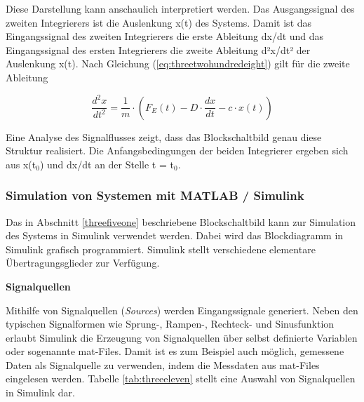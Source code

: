 \noindent Diese Darstellung kann anschaulich interpretiert werden. Das Ausgangssignal des zweiten Integrierers ist die Auslenkung x(t) des Systems. Damit ist das Eingangssignal des zweiten Integrierers die erste Ableitung dx/dt und das Eingangssignal des ersten Integrierers die zweite Ableitung d²x/dt² der Auslenkung x(t). Nach Gleichung (\ref{eq:threetwohundredeight}) gilt für die zweite Ableitung

\begin{equation}\label{eq:threetwohundrednine}
\frac{d^{2} x}{dt^{2}} = \frac{1}{m} \cdot (F_{E}(t) - D\cdot \frac{dx}{dt} - c\cdot x\left(t\right))
\end{equation}

\noindent Eine Analyse des Signalflusses zeigt, dass das Blockschaltbild genau diese Struktur realisiert. Die
Anfangsbedingungen der beiden Integrierer ergeben sich aus x(t$_{0}$) und dx/dt an der Stelle t = t$_{0}$.

\subsubsection{Simulation von Systemen mit MATLAB / Simulink}

\noindent Das in Abschnitt \ref{threefiveone} beschriebene Blockschaltbild kann zur Simulation des Systems in Simulink verwendet werden. Dabei wird das Blockdiagramm in Simulink grafisch programmiert. Simulink stellt verschiedene elementare Übertragungsglieder zur Verfügung.\medskip

{\selectfont
\noindent\textbf{Signalquellen}}

\noindent Mithilfe von Signalquellen (\textit{Sources}) werden Eingangssignale generiert. Neben den typischen Signalformen wie Sprung-, Rampen-, Rechteck- und Sinusfunktion erlaubt Simulink die Erzeugung von Signalquellen über selbst definierte Variablen oder sogenannte mat-Files. Damit ist es zum Beispiel auch möglich, gemessene Daten als Signalquelle zu verwenden, indem die Messdaten aus mat-Files eingelesen werden. Tabelle \ref{tab:threeeleven} stellt eine Auswahl von Signalquellen in Simulink dar.

\clearpage

